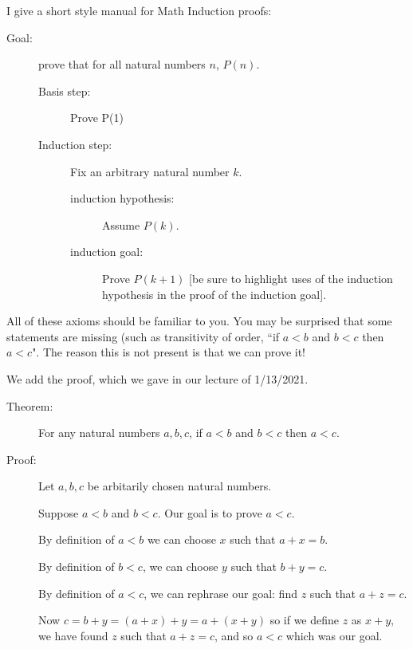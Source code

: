 \documentclass[12pt]{article}
\begin{document}
\newpage

I give a short style manual for Math Induction proofs:

\begin{description}

\item[Goal:]  prove that for all natural numbers $n$, $P(n)$.

\begin{description}

\item[Basis step:]  Prove P(1)

\item[Induction step:]

Fix an arbitrary natural number $k$.

\begin{description}

\item[induction hypothesis:]  Assume $P(k)$.

\item[induction goal:]  Prove $P(k+1)$ [be sure to highlight uses of the induction hypothesis in the proof of the induction goal].

\end{description}


\end{description}

\end{description}

All of these axioms should be familiar to you.  You may be surprised that some statements are missing (such as transitivity of order, ``if $a<b$ and $b<c$ then $a<c$".   The reason this is not present is that we can prove it!

We add the proof, which we gave in our lecture of 1/13/2021.

\begin{description}

\item[Theorem:]  For any natural numbers $a,b,c$, if $a<b$ and $b<c$ then $a<c$.

\item[Proof:]

Let $a,b,c$ be arbitarily chosen natural numbers.

Suppose $a<b$ and $b<c$.  Our goal is to prove $a<c$.

By definition of $a<b$ we can choose $x$ such that $a+x=b$.

By definition of $b<c$, we can choose $y$ such that $b+y=c$.

By definition of $a<c$, we can rephrase our goal:  find $z$ such that $a+z=c$.

Now $c = b+y = (a+x)+y = a+(x+y)$ so if we define $z$ as $x+y$, we have found
$z$ such that $a+z=c$, and so $a<c$ which was our goal.

\end{description}
\end{document}
